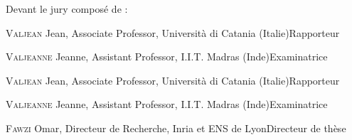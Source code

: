 \documentclass[11pt,a4paper]{book}
\begin{document}
\fontsize{12pt}{14pt}\selectfont
Devant le jury composé de :
\bigskip

\fontsize{11pt}{13pt}\selectfont



\textsc{Valjean} Jean, Associate Professor, Università di Catania (Italie)\hfill  Rapporteur

\medskip

\textsc{Valjeanne} Jeanne, Assistant Professor, I.I.T. Madras (Inde)\hfill Examinatrice

\medskip

\textsc{Valjean} Jean, Associate Professor, Università di Catania (Italie)\hfill  Rapporteur

\medskip

\textsc{Valjeanne} Jeanne, Assistant Professor, I.I.T. Madras (Inde)\hfill Examinatrice

\bigskip

\textsc{Fawzi} Omar, Directeur de Recherche, Inria et ENS de Lyon\hfill Directeur de thèse



\newpage
\end{document}

